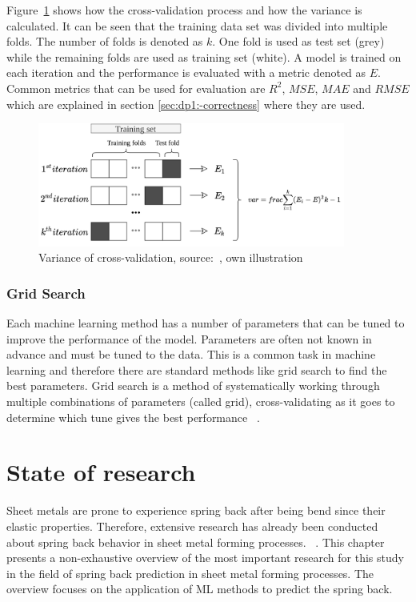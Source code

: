 Figure~\ref{fig:cross-validation} shows how the cross-validation process and how the variance
is calculated.
It can be seen that the training data set was divided into multiple folds.
The number of folds is denoted as $k$.
One fold is used as test set (grey) while the remaining folds are used as training set (white).
A model is trained on each iteration and the performance is evaluated with a metric denoted as $E$.
Common metrics that can be used for evaluation are $R^2$, $MSE$, $MAE$ and $RMSE$ which are explained in section
\ref{sec:dp1:-correctness} where they are used.

\begin{figure}[h]
    \begin{tcolorbox}[arc=0pt,boxrule=0.5pt]
        \centering
        \includegraphics[trim=left botm right top, width=0.9\textwidth]
        {chap2/images/cross_validation}
        \caption{Variance of cross-validation, source:~\cite[p. 260]{muller_introductionmachinelearning_2016}, own
        illustration }
        \label{fig:cross-validation}
    \end{tcolorbox}
\end{figure}

\subsubsection{Grid Search}\label{subsubsec:grid-search}
Each machine learning method has a number of parameters that can be tuned to improve the
performance of the model.
Parameters are often not known in advance and must be tuned to the data.
This is a common task in machine learning and therefore there are standard methods like
grid search to find the best parameters.
Grid search is a method of systematically working through multiple combinations of
parameters (called grid), cross-validating as it goes to determine which tune gives the best
performance
~\cite[p. 260--275]{muller_introductionmachinelearning_2016}.


\section{State of research}\label{sec:state-of-research}
Sheet metals are prone to experience spring back after being bend since their elastic properties.
Therefore, extensive research has already been conducted about spring back behavior in sheet metal forming processes.
~\cite[p. 566]{liu2021deep}.
This chapter presents a non-exhaustive overview of the most important research for this study in the field of
spring back prediction in sheet metal forming processes.
The overview focuses on the application of \ac{ML} methods to predict the spring back.

